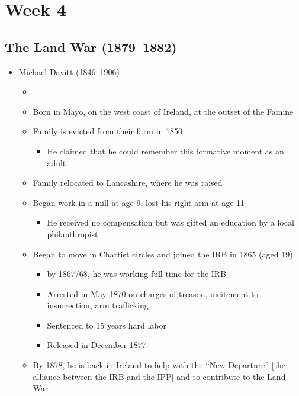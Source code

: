 \documentclass[12pt]{article}
\begin{document}
    \section{Week 4}
        \subsection{The Land War (1879--1882)}
            \begin{itemize}
                \item Michael Davitt (1846--1906)
                \begin{itemize}
                    \item 
                    \item Born in Mayo, on the west coast of Ireland, at the outset of the Famine
                    \item Family is evicted from their farm in 1850
                    \begin{itemize}
                        \item He claimed that he could remember this formative moment as an adult
                    \end{itemize}
                    \item Family relocated to Lancashire, where he was raised
                    \item Began work in a mill at age 9, lost his right arm at age 11
                    \begin{itemize}
                        \item He received no compensation but was gifted an education by a local philanthropist 
                    \end{itemize}
                    \item Began to move in Chartist circles and joined the IRB in 1865 (aged 19)
                    \begin{itemize}
                        \item by 1867/68, he was working full-time for the IRB
                        \item Arrested in May 1870 on charges of treason, incitement to insurrection, arm trafficking
                        \item Sentenced to 15 years hard labor
                        \item Released in December 1877
                    \end{itemize}
                    \item By 1878, he is back in Ireland to help with the ``New Departure'' [the alliance between the IRB and the IPP] and to contribute to the Land War

\end{itemize}
\end{itemize}
\end{document}
